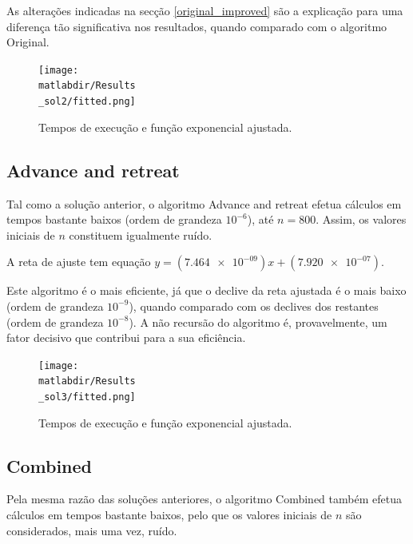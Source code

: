 \documentclass[portuguese,11pt,a4paper,titlepage]{article}
\newcommand{\matlabdir}{"../MATLAB-fittings"}
\begin{document}
As alterações indicadas na secção \ref{original_improved} são a explicação para uma diferença tão significativa nos resultados,
quando comparado com o algoritmo Original.

\begin{figure}[h]
	\centering
	\texttt{[image: \\matlabdir/Results\\\_sol2/fitted.png]}
	\caption{Tempos de execução e função exponencial ajustada.}
	\label{fig:sol2}
\end{figure}
\pagebreak

\subsection{Advance and retreat}
Tal como a solução anterior, o algoritmo Advance and retreat efetua cálculos em tempos bastante baixos
(ordem de grandeza \begin{math}10^{-6}\end{math}), até \begin{math}n = 800\end{math}.
Assim, os valores iniciais de \begin{math}n\end{math} constituem igualmente ruído.

A reta de ajuste tem equação \begin{math}y=(\num{7.464e-09})x+(\num{7.920e-07})\end{math}.

Este algoritmo é o mais eficiente, já que o declive da reta ajustada é o mais baixo
(ordem de grandeza \begin{math}10^{-9}\end{math}), quando comparado com os
declives dos restantes (ordem de grandeza \begin{math}10^{-8}\end{math}).
A não recursão do algoritmo é, provavelmente, um fator decisivo que contribui para a sua eficiência.

\begin{figure}[h]
	\centering
	\texttt{[image: \\matlabdir/Results\\\_sol3/fitted.png]}
	\caption{Tempos de execução e função exponencial ajustada.}
	\label{fig:sol3}
\end{figure}

\subsection{Combined}
Pela mesma razão das soluções anteriores, o algoritmo Combined também efetua cálculos em tempos bastante
baixos, pelo que os valores iniciais de \begin{math}n\end{math} são considerados, mais uma vez, ruído.
\end{document}
